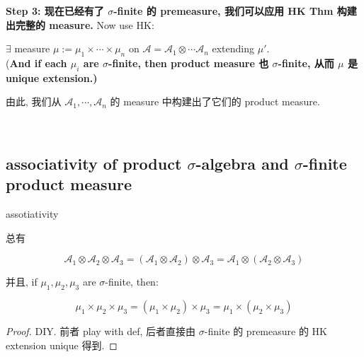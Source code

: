 \documentclass{qlnotes-export}
\begin{document}
\textbf{Step 3: 现在已经有了 \(\sigma\)-finite 的 premeasure, 我们可以应用 HK Thm 构建出完整的 measure.} Now use HK:

\begin{corollary}\label{cor-06-product-measure-fubini-tonelli-corollary-002}

\(\exists\) measure \(\mu := \mu_{1} \times \cdots \times \mu_{n}\) on \(\mathcal{A} = \mathcal{A}_{1} \otimes \cdots\mathcal{A}_{n}\) extending \(\mu'\).\\
(\textbf{And if each \(\mu_{i}\) are \(\sigma\)-finite, then product measure 也 \(\sigma\)-finite, 从而 \(\mu\) 是 unique extension.)}

\end{corollary}

由此, 我们从 \(\mathcal{A}_{1},\cdots,\mathcal{A}_{n}\) 的 measure 中构建出了它们的 product measure.\\
\strut \\

\subsection{\texorpdfstring{associativity of product \(\sigma\)-algebra and \(\sigma\)-finite product measure}{associativity of product \textbackslash sigma-algebra and \textbackslash sigma-finite product measure}}\label{associativity-of-product-sigma-algebra-and-sigma-finite-product-measure}

\begin{corollary}{assotiativity}\label{cor-06-product-measure-fubini-tonelli-assotiativity}

总有

\[\mathcal{A}_{1} \otimes \mathcal{A}_{2} \otimes \mathcal{A}_{3} = (\mathcal{A}_{1} \otimes \mathcal{A}_{2}) \otimes \mathcal{A}_{3} = \mathcal{A}_{1} \otimes (\mathcal{A}_{2} \otimes \mathcal{A}_{3})\]

并且, if \(\mu_{1},\mu_{2},\mu_{3}\) are \(\sigma\)-finite, then:

\[\mu_{1} \times \mu_{2} \times \mu_{3} = (\mu_{1} \times \mu_{2}) \times \mu_{3} = \mu_{1} \times (\mu_{2} \times \mu_{3})\]

\end{corollary}

\begin{proof}

DIY. 前者 play with def, 后者直接由 \(\sigma\)-finite 的 premeasure 的 HK extension unique 得到.

\end{proof}
\end{document}
